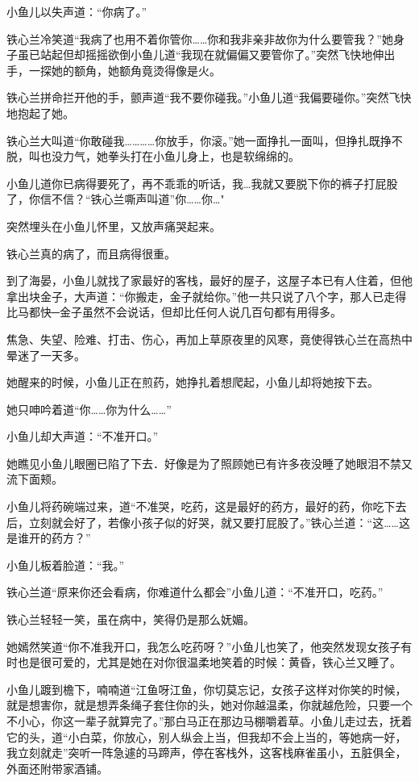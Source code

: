 \documentclass[12pt,oneside]{book}
\begin{document}
小鱼儿以失声道：``你病了。''

铁心兰冷笑道``我病了也用不着你管你\ldots\ldots 你和我非亲非故你为什么要管我？''她身子虽已站起但却摇摇欲倒小鱼儿道``我现在就偏偏又要管你了。''突然飞快地伸出手，一探她的额角，她额角竟烫得像是火。

铁心兰拼命拦开他的手，颤声道``我不要你碰我。''小鱼儿道``我偏要碰你。''突然飞快地抱起了她。

铁心兰大叫道``你敢碰我\ldots\ldots\ldots\ldots 你放手，你滚。''她一面挣扎一面叫，但挣扎既挣不脱，叫也没力气，她拳头打在小鱼儿身上，也是软绵绵的。

小鱼儿道你已病得要死了，再不乖乖的听话，我\ldots 我就又要脱下你的裤子打屁股了，你信不信？``铁心兰嘶声叫道''你\ldots\ldots 你\ldots"

突然埋头在小鱼儿怀里，又放声痛哭起来。

铁心兰真的病了，而且病得很重。

到了海晏，小鱼儿就找了家最好的客栈，最好的屋子，这屋子本已有人住着，但他拿出块金子，大声道：``你搬走，金子就给你。''他一共只说了八个字，那人已走得比马都快─金子虽然不会说话，但却比任何人说几百句都有用得多。

焦急、失望、险难、打击、伤心，再加上草原夜里的风寒，竟使得铁心兰在高热中晕迷了一天多。

她醒来的时候，小鱼儿正在煎药，她挣扎着想爬起，小鱼儿却将她按下去。

她只呻吟着道``你\ldots\ldots 你为什么\ldots\ldots{}''

小鱼儿却大声道：``不准开口。''

她瞧见小鱼儿眼圈已陷了下去．好像是为了照顾她已有许多夜没睡了她眼泪不禁又流下面颊。

小鱼儿将药碗端过来，道``不准哭，吃药，这是最好的药方，最好的药，你吃下去后，立刻就会好了，若像小孩子似的好哭，就又要打屁股了。''铁心兰道：``这\ldots\ldots 这是谁开的药方？''

小鱼儿板着脸道：``我。''

铁心兰道``原来你还会看病，你难道什么都会''小鱼儿道：``不准开口，吃药。''

铁心兰轻轻一笑，虽在病中，笑得仍是那么妩媚。

她嫣然笑道``你不准我开口，我怎么吃药呀？''小鱼儿也笑了，他突然发现女孩子有时也是很可爱的，尤其是她在对你很温柔地笑着的时候：黄昏，铁心兰又睡了。

小鱼儿踱到檐下，喃喃道``江鱼呀江鱼，你切莫忘记，女孩子这样对你笑的时候，就是想害你，就是想弄条绳子套住你的头，她对你越温柔，你就越危险，只要一个不小心，你这一辈子就算完了。''那白马正在那边马棚嚼着草。小鱼儿走过去，抚着它的头，道``小白菜，你放心，别人纵会上当，但我却不会上当的，等她病一好，我立刻就走''突听一阵急遽的马蹄声，停在客栈外，这客栈麻雀虽小，五脏俱全，外面还附带家酒铺。
\end{document}
